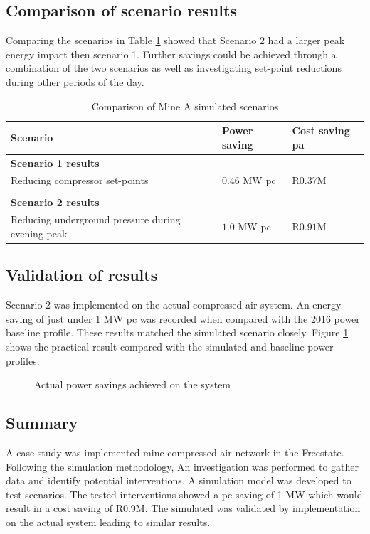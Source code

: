 \subsection{Comparison of scenario results}
Comparing the scenarios in Table \ref{Table: A Comparison} showed that Scenario 2 had a larger peak energy impact then scenario 1. Further savings could be achieved through a combination of the two scenarios as well as investigating set-point reductions during other periods of the day.
\begin{table}[h!]
	\centering
	\begin{tabular}{p{}
			p{}
			p{}}
		\hline 
		Scenario  &  Power saving & Cost saving \gls{pa}  \\
		\hline
		\multicolumn{3}{l}{\textbf{Scenario 1 results}} \\
		Reducing compressor set-points & $ 0.46 $ MW \gls{pc} & R0.37M \\
		\\
		\multicolumn{3}{l}{\textbf{Scenario 2 results}}  \\
		Reducing underground pressure during evening peak& $ 1.0 $ MW \gls{pc} & R$ 0.91 $M\\
		\hline 
	\end{tabular}
	\caption{Comparison of Mine A simulated scenarios}
	\label{Table: A Comparison}
\end{table}

\subsection{Validation of results}
Scenario 2 was implemented on the actual compressed air system. An energy saving of just under 1 MW \gls{pc} was recorded when compared with the 2016 power baseline profile. These results matched the simulated scenario closely. Figure \ref{fig: Actual permormance beet} shows the practical result compared with the simulated and baseline power profiles.
\begin{figure}[h]
	\centering
	
	\caption{Actual power savings achieved on the system}
	\label{fig: Actual permormance beet}
\end{figure}
\subsection{Summary}
A case study was implemented mine compressed air network in the Freestate. Following the simulation methodology, An investigation was performed to gather data and identify potential interventions. A simulation model was developed to test scenarios. The tested interventions showed a \gls{pc} saving of 1 MW which would result in a cost saving of R0.9M. The simulated was validated by implementation on the actual system leading to similar results.
\clearpage
